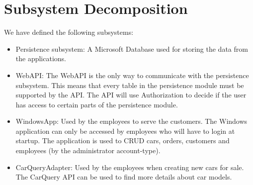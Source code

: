 \section{Subsystem Decomposition}
We have defined the following subsystems:
\begin{itemize}
	\item Persistence subsystem: A Microsoft Database used for storing the data from the applications.
	\item WebAPI: The WebAPI is the only way to communicate with the persistence subsystem. This means that every table in the persistence module must be supported by the API. The API will use Authorization to decide if the user has access to certain parts of the persistence module.
	\item WindowsApp: Used by the employees to serve the customers. The Windows application can only be accessed by employees who will have to login at startup. The application is used to CRUD cars, orders, customers and employees (by the administrator account-type).
	\item CarQueryAdapter: Used by the employees when creating new cars for sale. The CarQuery API can be used to find more details about car models.
\end{itemize}